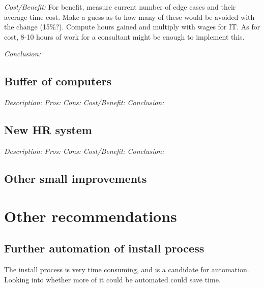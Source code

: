 \emph{Cost/Benefit:} For benefit, measure current number of edge cases and their average time cost.
Make a guess as to how many of these would be avoided with the change (15\%?).
Compute hours gained and multiply with wages for IT.
As for cost, 8-10 hours of work for a consultant might be enough to implement this.

\emph{Conclusion:} 

\subsection{Buffer of computers}
\emph{Description:}
\emph{Pros:}
\emph{Cons:}
\emph{Cost/Benefit:}
\emph{Conclusion:}

\subsection{New HR system}
\emph{Description:}
\emph{Pros:}
\emph{Cons:}
\emph{Cost/Benefit:}
\emph{Conclusion:}

\subsection{Other small improvements}

\section{Other recommendations}
\subsection{Further automation of install process}
The install process is very time consuming, and is a candidate for automation.
Looking into whether more of it could be automated could save time.